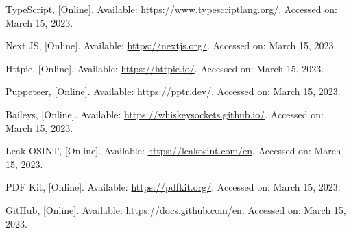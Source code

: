 \begin{thebibliography}{1}
    TypeScript, [Online]. Available: \url{https://www.typescriptlang.org/}. Accessed on: March 15, 2023.

    Next.JS, [Online]. Available: \url{https://nextjs.org/}. Accessed on: March 15, 2023.

    Httpie, [Online]. Available: \url{https://httpie.io/}. Accessed on: March 15, 2023.

    Puppeteer, [Online]. Available: \url{https://pptr.dev/}. Accessed on: March 15, 2023.

    Baileys, [Online]. Available: \url{https://whiskeysockets.github.io/}. Accessed on: March 15, 2023.

    Leak OSINT, [Online]. Available: \url{https://leakosint.com/en}. Accessed on: March 15, 2023.

    PDF Kit, [Online]. Available: \url{https://pdfkit.org/}. Accessed on: March 15, 2023.

    GitHub, [Online]. Available: \url{https://docs.github.com/en}. Accessed on: March 15, 2023.
    
\end{thebibliography}
    
